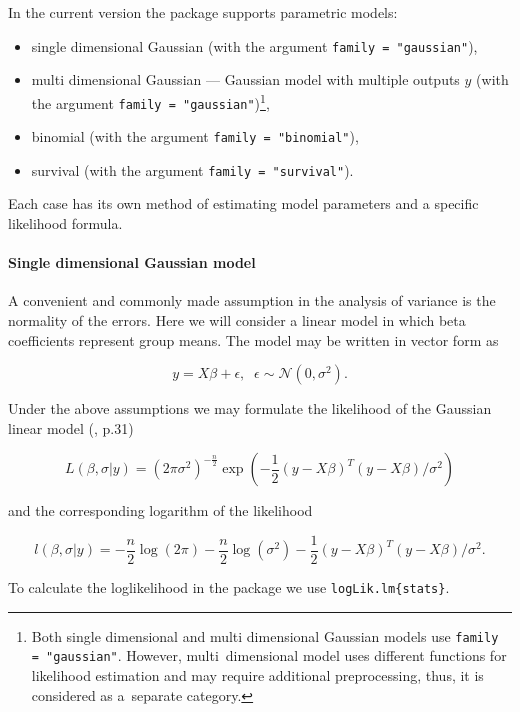 \documentclass[12pt]{article}
\newcommand{\code}{\texttt}
\begin{document}
In the current version the package supports parametric models: 

\begin{itemize}
\item single dimensional Gaussian (with the argument \code{family = "gaussian"}),
\item multi dimensional Gaussian --- Gaussian model with multiple outputs $y$ (with the argument \code{family = "gaussian"})\footnote{Both single dimensional and multi dimensional Gaussian models use \code{family = "gaussian"}. However, multi~dimensional model uses different functions for likelihood estimation and may require additional preprocessing, thus, it is considered as a~separate category.},
\item binomial (with the argument \code{family = "binomial"}),
\item survival (with the argument \code{family = "survival"}).
\end{itemize}

Each case has its own method of estimating model parameters and a specific likelihood formula.

\paragraph{Single dimensional Gaussian model}

A convenient and commonly made assumption in the analysis of variance is the normality of the errors. Here we will consider a linear model in which beta coefficients represent group means. The model may be written in vector form as

$$y = X \beta + \epsilon, \;\; \epsilon \sim \mathcal{N}\left(0, \sigma^2\right).$$


Under the above assumptions we may formulate the likelihood of the Gaussian linear model (\citealp{friedman2001elements}, p.31)

$$L\left(\beta, \sigma | y\right) = \left(2\pi \sigma^2\right)^{-\frac{n}{2}} 
\exp{\left(-\frac{1}{2}\left(y - X\beta\right)^T\left(y - X\beta\right)/ \sigma^2\right)}$$

and the corresponding logarithm of the likelihood

$$l\left(\beta, \sigma | y\right) = 
-\frac{n}{2} \log{\left(2\pi\right)} -\frac{n}{2} \log{\left(\sigma^2\right)} -\frac{1}{2}\left(y - X\beta\right)^T\left(y - X\beta\right)/ \sigma^2.$$


To calculate the loglikelihood in the package we use \code{logLik.lm\{stats\}}.
\end{document}
